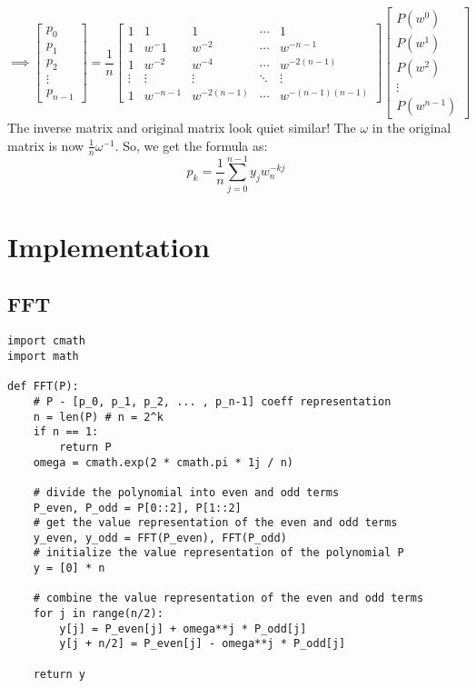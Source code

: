 \documentclass{report}
\begin{document}
\begin{equation*}
\implies 
    \begin{bmatrix}
        p_0 \\
        p_1 \\
        p_2 \\
        \vdots \\
        p_{n-1}
    \end{bmatrix}
    = 
    \frac{1}{n}
  \begin{bmatrix} 
  1     & 1     & 1     & \cdots & 1    \\ 
  1     & w^-1     & w^{-2}   & \cdots & w^{-n-1} \\ 
  1     & w^{-2}   & w^{-4}   & \cdots & w^{-2(n-1)} \\
  \vdots & \vdots & \vdots  & \ddots & \vdots \\
  1 & w^{-n-1} & w^{-2(n-1)}  & \cdots & w^{-(n-1)(n-1)} 
\end{bmatrix} 
    \begin{bmatrix}
    P(w^0) \\
    P(w^1) \\
    P(w^2) \\
    \vdots \\
    P(w^{n-1})
  \end{bmatrix}     
\end{equation*}
The inverse matrix and original matrix look quiet similar! The $\omega$ in the original matrix is now $\frac{1}{n} \omega^{-1}$.
So, we get the formula as: 
$$p_k = \frac{1}{n} \sum_{j=0}^{n-1} y_j w_n^{-k j}$$




\chapter{Implementation}
\section{FFT}
\begin{verbatim}
import cmath
import math

def FFT(P):
	# P - [p_0, p_1, p_2, ... , p_n-1] coeff representation
	n = len(P) # n = 2^k
	if n == 1:
		return P
	omega = cmath.exp(2 * cmath.pi * 1j / n)

	# divide the polynomial into even and odd terms
	P_even, P_odd = P[0::2], P[1::2]
	# get the value representation of the even and odd terms
	y_even, y_odd = FFT(P_even), FFT(P_odd)
	# initialize the value representation of the polynomial P
	y = [0] * n

	# combine the value representation of the even and odd terms
	for j in range(n/2):
		y[j] = P_even[j] + omega**j * P_odd[j]
		y[j + n/2] = P_even[j] - omega**j * P_odd[j]

	return y
\end{verbatim}
\end{document}
